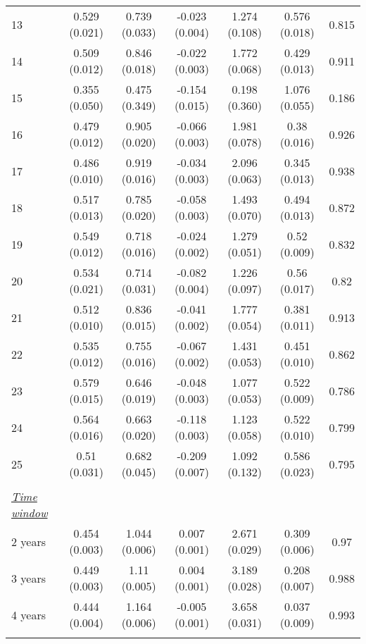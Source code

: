 \begin{tabular}{@{\extracolsep{5pt}} l cccccc}
13 & 0.529 (0.021) & 0.739 (0.033) & -0.023 (0.004) & 1.274 (0.108) & 0.576 (0.018) & 0.815 \\ 
14 & 0.509 (0.012) & 0.846 (0.018) & -0.022 (0.003) & 1.772 (0.068) & 0.429 (0.013) & 0.911 \\ 
15 & 0.355 (0.050) & 0.475 (0.349) & -0.154 (0.015) & 0.198 (0.360) & 1.076 (0.055) & 0.186 \\ 
16 & 0.479 (0.012) & 0.905 (0.020) & -0.066 (0.003) & 1.981 (0.078) & 0.38 (0.016) & 0.926 \\ 
17 & 0.486 (0.010) & 0.919 (0.016) & -0.034 (0.003) & 2.096 (0.063) & 0.345 (0.013) & 0.938 \\ 
18 & 0.517 (0.013) & 0.785 (0.020) & -0.058 (0.003) & 1.493 (0.070) & 0.494 (0.013) & 0.872 \\ 
19 & 0.549 (0.012) & 0.718 (0.016) & -0.024 (0.002) & 1.279 (0.051) & 0.52 (0.009) & 0.832 \\ 
20 & 0.534 (0.021) & 0.714 (0.031) & -0.082 (0.004) & 1.226 (0.097) & 0.56 (0.017) & 0.82 \\ 
21 & 0.512 (0.010) & 0.836 (0.015) & -0.041 (0.002) & 1.777 (0.054) & 0.381 (0.011) & 0.913 \\ 
22 & 0.535 (0.012) & 0.755 (0.016) & -0.067 (0.002) & 1.431 (0.053) & 0.451 (0.010) & 0.862 \\ 
23 & 0.579 (0.015) & 0.646 (0.019) & -0.048 (0.003) & 1.077 (0.053) & 0.522 (0.009) & 0.786 \\ 
24 & 0.564 (0.016) & 0.663 (0.020) & -0.118 (0.003) & 1.123 (0.058) & 0.522 (0.010) & 0.799 \\ 
25 & 0.51 (0.031) & 0.682 (0.045) & -0.209 (0.007) & 1.092 (0.132) & 0.586 (0.023) & 0.795 \\ 
 &   &   &   &   &   &  \\ 
\underline{{\it Time window}} &   &   &   &   &   &  \\ 
2 years & 0.454 (0.003) & 1.044 (0.006) & 0.007 (0.001) & 2.671 (0.029) & 0.309 (0.006) & 0.97 \\ 
3 years & 0.449 (0.003) & 1.11 (0.005) & 0.004 (0.001) & 3.189 (0.028) & 0.208 (0.007) & 0.988 \\ 
4 years & 0.444 (0.004) & 1.164 (0.006) & -0.005 (0.001) & 3.658 (0.031) & 0.037 (0.009) & 0.993 \\ 
\hline \\[-1.8ex] 
\end{tabular} 
